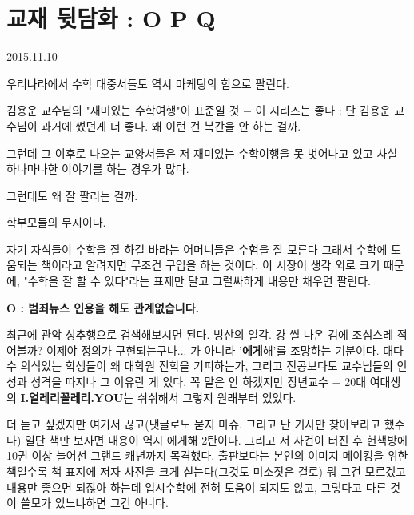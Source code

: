 \section{교재 뒷담화 : O P Q}
\href{https://www.kockoc.com/Apoc/472974}{2015.11.10}

\vspace{5mm}

우리나라에서 수학 대중서들도 역시 마케팅의 힘으로 팔린다.
\vspace{5mm}

김용운 교수님의 "재미있는 수학여행"이 표준일 것 $-$ 이 시리즈는 좋다 : 단 김용운 교수님이 과거에 썼던게 더 좋다.
왜 이런 건 복간을 안 하는 걸까.
\vspace{5mm}

그런데 그 이후로 나오는 교양서들은 저 재미있는 수학여행을 못 벗어나고 있고
사실 하나마나한 이야기를 하는 경우가 많다.
\vspace{5mm}

그런데도 왜 잘 팔리는 걸까.
\vspace{5mm}

학부모들의 무지이다.
\vspace{5mm}

자기 자식들이 수학을 잘 하길 바라는 어머니들은 수험을 잘 모른다
그래서 수학에 도움되는 책이라고 알려지면 무조건 구입을 하는 것이다.
이 시장이 생각 외로 크기 때문에, "수학을 잘 할 수 있다"라는 표제만 달고 그럴싸하게 내용만 채우면 팔린다.
\vspace{5mm}

\textbf{O : 범죄뉴스 인용을 해도 관계없습니다.}
\vspace{5mm}

최근에 관악 성추행으로 검색해보시면 된다.
빙산의 일각.
걍 썰 나온 김에 조심스레 적어볼까?
이제야 정의가 구현되는구나... 가 아니라 '\textbf{에게}해'를 조망하는 기분이다.
대다수 의식있는 학생들이 왜 대학원 진학을 기피하는가, 그리고 전공보다도 교수님들의 인성과 성격을 따지나 그 이유란 게 있다.
꼭 말은 안 하겠지만 장년교수 $-$ 20대 여대생의  \textbf{I.얼레리꼴레리.YOU}는 쉬쉬해서 그렇지 원래부터 있었다.
\vspace{5mm}

더 듣고 싶겠지만 여기서 끊고(댓글로도 묻지 마슈. 그리고 난 기사만 찾아보라고 했수다)
일단 책만 보자면 내용이 역시 에게해 2탄이다. 그리고 저 사건이 터진 후 헌책방에 10권 이상 늘어선 그랜드 캐년까지 목격했다.
출판보다는 본인의 이미지 메이킹을 위한 책일수록 책 표지에 저자 사진을 크게 싣는다(그것도 미소짓은 걸로)
뭐 그건 모르겠고 내용만 좋으면 되잖아 하는데 입시수학에 전혀 도움이 되지도 않고,
그렇다고 다른 것이 쓸모가 있느냐하면 그건 아니다.
\vspace{5mm}

